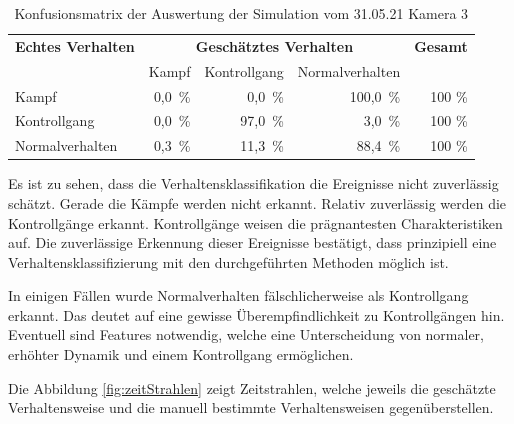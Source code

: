 \begin{table}[htbp]
    \centering
    \caption{Konfusionsmatrix der Auswertung der Simulation vom 31.05.21 Kamera 3}
    \label{tab:KonfMatSim 2}
    \begin{tabular}{l|rrr|r}
        \toprule
        \multirow{1}{*}{\textbf{Echtes Verhalten}} & \multicolumn{3}{c|}{\textbf{Geschätztes Verhalten}} & {\textbf{Gesamt}}\\
         & Kampf & Kontrollgang & Normalverhalten & \\
        \midrule
        Kampf                & 0,0\, \% &  0,0\, \% & 100,0\, \% & 100 \%\\
        Kontrollgang         & 0,0\, \% & 97,0\, \% &   3,0\, \% & 100 \%\\
        Normalverhalten      & 0,3\, \% & 11,3\, \% &  88,4\, \% & 100 \%\\
        \bottomrule
    \end{tabular}
\end{table}

Es ist zu sehen, dass die Verhaltensklassifikation die Ereignisse nicht zuverlässig schätzt. Gerade die Kämpfe werden nicht erkannt. Relativ zuverlässig werden die Kontrollgänge erkannt. Kontrollgänge weisen die prägnantesten Charakteristiken auf. Die zuverlässige Erkennung dieser Ereignisse bestätigt, dass prinzipiell eine Verhaltensklassifizierung mit den durchgeführten Methoden möglich ist. \par

In einigen Fällen wurde Normalverhalten fälschlicherweise als Kontrollgang erkannt. Das deutet auf eine gewisse Überempfindlichkeit zu Kontrollgängen hin. Eventuell sind Features notwendig, welche eine Unterscheidung von normaler, erhöhter Dynamik und einem Kontrollgang ermöglichen. \par

Die Abbildung \ref{fig:zeitStrahlen} zeigt Zeitstrahlen, welche jeweils die geschätzte Verhaltensweise und die manuell bestimmte Verhaltensweisen gegenüberstellen.  

